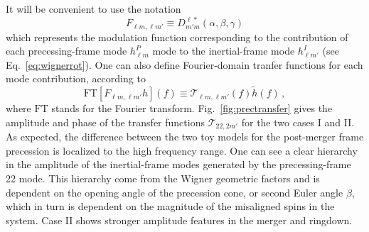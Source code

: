 \documentclass[aps,showpacs,%
prd,superscriptaddress,nofootinbib]{revtex4}
\newcommand{\be}{\begin{equation}}
\newcommand{\ee}{\end{equation}}
\newcommand\calT{{\mathcal{T}}}
\begin{document}
It will be convenient to use the notation
\be\label{eq:defFlmlmp}
	F_{\ell m, \ell m'} \equiv D^{\ell *}_{m'm} (\alpha,\beta,\gamma)
\ee
which represents the modulation function corresponding to the contribution of each precessing-frame mode $h^{P}_{\ell m}$ mode to the inertial-frame mode $h^{I}_{\ell m'}$ (see Eq.~\eqref{eq:wignerrot}). One can also define Fourier-domain tranfer functions for each mode contribution, according to
\be\label{eq:defTlmlmp}
	\mathrm{FT} \left[F_{\ell m, \ell m'} h \right] (f) \equiv \calT_{\ell m, \ell m'} (f) \tilde{h}(f) \,,
\ee
where $\mathrm{FT}$ stands for the Fourier transform. Fig.~\ref{fig:prectransfer} gives the amplitude and phase of the transfer functions $\calT_{22, 2 m'}$ for the two cases I and II. As expected, the difference between the two toy models for the post-merger frame precession is localized to the high frequency range. One can see a clear hierarchy in the amplitude of the inertial-frame modes generated by the precessing-frame 22 mode. This hierarchy come from the Wigner geometric factors and is dependent on the opening angle of the precession cone, or second Euler angle $\beta$, which in turn is dependent on the magnitude of the misaligned spins in the system. Case II shows stronger amplitude features in the merger and ringdown.
\end{document}
